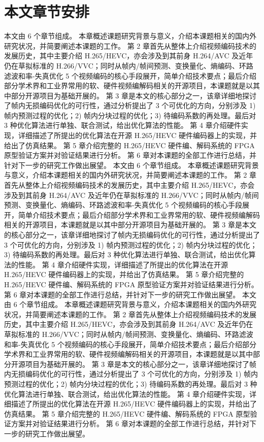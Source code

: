 \section{本文章节安排}
本文由 6 个章节组成。
本章概述课题研究背景与意义，介绍本课题相关的国内外研究状况，并简要阐述本课题的工作。
第 2 章首先从整体上介绍视频编码技术的发展历史，其中主要介绍 H.265/HEVC，亦会涉及到其前身 H.264/AVC 及近年仍在草拟标准的 H.266/VVC；同时从帧内/帧间预测、变换量化、熵编码、环路滤波和率-失真优化 5 个视频编码的核心手段展开，简单介绍技术要点；最后介绍部分学术界和工业界常用的软、硬件视频编解码相关的开源项目，本课题就是以其中部分开源项目为基础开展的。
第 3 章是本文的核心部分之一，该章详细地探讨了帧内无损编码优化的可行性，通过分析提出了 3 个可优化的方向，分别涉及 1) 帧内预测过程的优化；2) 帧内分块过程的优化；3) 待编码系数的再处理。最后对 3 种优化算法进行单独、联合测试，给出优化算法的性能。
第 4 章介绍硬件实现，详细描述了所提出的优化算法在开源 H.265/HEVC 硬件编码器上的实现，并给出了仿真结果。
第 5 章介绍完整的 H.265/HEVC 硬件编、解码系统的 FPGA 原型验证方案并对验证结果进行分析。
第 6 章对本课题的全部工作进行总结，并针对下一步的研究工作做出展望。
本文由 6 个章节组成。
本章概述课题研究背景与意义，介绍本课题相关的国内外研究状况，并简要阐述本课题的工作。
第 2 章首先从整体上介绍视频编码技术的发展历史，其中主要介绍 H.265/HEVC，亦会涉及到其前身 H.264/AVC 及近年仍在草拟标准的 H.266/VVC；同时从帧内/帧间预测、变换量化、熵编码、环路滤波和率-失真优化 5 个视频编码的核心手段展开，简单介绍技术要点；最后介绍部分学术界和工业界常用的软、硬件视频编解码相关的开源项目，本课题就是以其中部分开源项目为基础开展的。
第 3 章是本文的核心部分之一，该章详细地探讨了帧内无损编码优化的可行性，通过分析提出了 3 个可优化的方向，分别涉及 1) 帧内预测过程的优化；2) 帧内分块过程的优化；3) 待编码系数的再处理。最后对 3 种优化算法进行单独、联合测试，给出优化算法的性能。
第 4 章介绍硬件实现，详细描述了所提出的优化算法在开源 H.265/HEVC 硬件编码器上的实现，并给出了仿真结果。
第 5 章介绍完整的 H.265/HEVC 硬件编、解码系统的 FPGA 原型验证方案并对验证结果进行分析。
第 6 章对本课题的全部工作进行总结，并针对下一步的研究工作做出展望。
本文由 6 个章节组成。
本章概述课题研究背景与意义，介绍本课题相关的国内外研究状况，并简要阐述本课题的工作。
第 2 章首先从整体上介绍视频编码技术的发展历史，其中主要介绍 H.265/HEVC，亦会涉及到其前身 H.264/AVC 及近年仍在草拟标准的 H.266/VVC；同时从帧内/帧间预测、变换量化、熵编码、环路滤波和率-失真优化 5 个视频编码的核心手段展开，简单介绍技术要点；最后介绍部分学术界和工业界常用的软、硬件视频编解码相关的开源项目，本课题就是以其中部分开源项目为基础开展的。
第 3 章是本文的核心部分之一，该章详细地探讨了帧内无损编码优化的可行性，通过分析提出了 3 个可优化的方向，分别涉及 1) 帧内预测过程的优化；2) 帧内分块过程的优化；3) 待编码系数的再处理。最后对 3 种优化算法进行单独、联合测试，给出优化算法的性能。
第 4 章介绍硬件实现，详细描述了所提出的优化算法在开源 H.265/HEVC 硬件编码器上的实现，并给出了仿真结果。
第 5 章介绍完整的 H.265/HEVC 硬件编、解码系统的 FPGA 原型验证方案并对验证结果进行分析。
第 6 章对本课题的全部工作进行总结，并针对下一步的研究工作做出展望。

